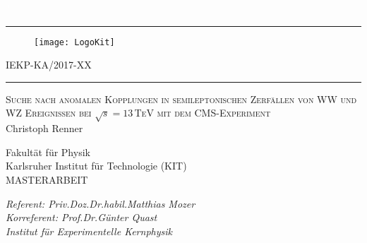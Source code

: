 \begin{titlepage}
  \begin{addmargin}[1.5cm]{0cm}
    \thispagestyle{empty}
    \vspace{-1cm}
    \begin{center}
                \textcolor{white}{´}\vspace{-3.5cm}
                  \rule{\linewidth}{0.75pt}
                    \vspace{-0.15cm}


\begin{figure}[htbp]
  \centering
  \hspace{26pt}
  \texttt{[image: LogoKit]}
\end{figure}

      \vspace{-0.45cm}
\hspace{9cm}IEKP-KA/2017-XX
\rule{\linewidth}{0.75pt}

\vspace{0.8cm}

  \Large{\textsc{Suche nach anomalen Kopplungen in semileptonischen Zerf\"allen von WW und WZ Ereignissen bei $\sqrt{s}=13$\,TeV mit dem CMS-Experiment}}\\

\vspace{0.9cm}
\Large{Christoph Renner}\\
\vspace{0.9cm}
\vspace{1cm}
\large{Fakult\"at f\"ur Physik\\
  
  Karlsruher Institut f\"ur Technologie (KIT)\\
  \vspace{0.825 cm}
  \large{MASTERARBEIT}\\
  \vspace{0.825 cm}

  \large{\textit{Referent: Priv.\;Doz.\;Dr.\;habil.\;Matthias Mozer}}\\
  \large{\textit{Korreferent: Prof.\;Dr.\;G\"unter Quast}}\\
   \vspace{0.2 cm}
\large{\textit{Institut f\"ur Experimentelle Kernphysik}}\\


}
\end{center}
\end{addmargin}
\end{titlepage}
